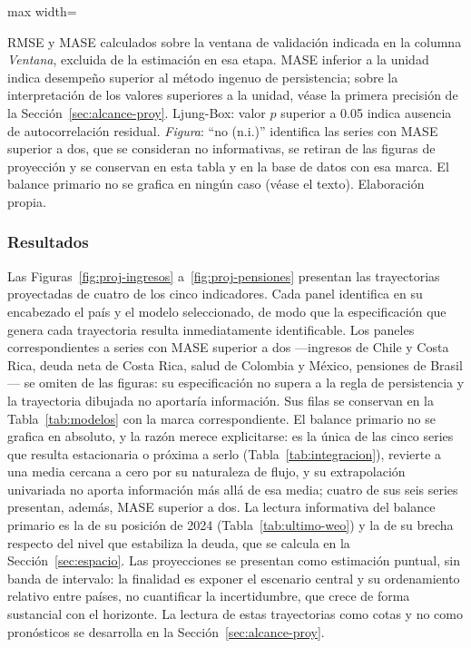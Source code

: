 \documentclass[12pt, letterpaper]{article}
\begin{document}
\begin{table}[htbp]
  \centering
  \caption{Modelo seleccionado por serie, desempeño fuera de muestra y diagnóstico
  de residuales.}
  \label{tab:modelos}
  \begin{adjustbox}{max width=\textwidth}
  
  \end{adjustbox}

  \vspace{2pt}
  \footnotesize
  RMSE y MASE calculados sobre la ventana de validación indicada en la columna
  \emph{Ventana}, excluida de la estimación en esa etapa. MASE inferior a la unidad
  indica desempeño superior al método ingenuo de persistencia; sobre la
  interpretación de los valores superiores a la unidad, véase la primera precisión
  de la Sección~\ref{sec:alcance-proy}. Ljung-Box: valor $p$ superior a 0.05 indica
  ausencia de autocorrelación residual. \emph{Figura}: ``no (n.i.)'' identifica las
  series con MASE superior a dos, que se consideran no informativas, se retiran de
  las figuras de proyección y se conservan en esta tabla y en la base de datos con
  esa marca. El balance primario no se grafica en ningún caso (véase el texto).
  Elaboración propia.
\end{table}

\subsubsection{Resultados}

Las Figuras~\ref{fig:proj-ingresos} a~\ref{fig:proj-pensiones} presentan las
trayectorias proyectadas de cuatro de los cinco indicadores. Cada panel identifica
en su encabezado el país y el modelo seleccionado, de modo que la especificación
que genera cada trayectoria resulta inmediatamente identificable. Los paneles
correspondientes a series con MASE superior a dos ---ingresos de Chile y Costa
Rica, deuda neta de Costa Rica, salud de Colombia y México, pensiones de Brasil---
se omiten de las figuras: su especificación no supera a la regla de persistencia y
la trayectoria dibujada no aportaría información. Sus filas se conservan en la
Tabla~\ref{tab:modelos} con la marca correspondiente. El balance primario no se
grafica en absoluto, y la razón merece explicitarse: es la única de las cinco
series que resulta estacionaria o próxima a serlo (Tabla~\ref{tab:integracion}),
revierte a una media cercana a cero por su naturaleza de flujo, y su extrapolación
univariada no aporta información más allá de esa media; cuatro de sus seis series
presentan, además, MASE superior a dos. La lectura informativa del balance primario
es la de su posición de 2024 (Tabla~\ref{tab:ultimo-weo}) y la de su brecha respecto
del nivel que estabiliza la deuda, que se calcula en la Sección~\ref{sec:espacio}.
Las proyecciones se presentan como estimación puntual,
sin banda de intervalo: la finalidad es exponer el escenario central y su ordenamiento
relativo entre países, no cuantificar la incertidumbre, que crece de forma sustancial
con el horizonte. La lectura de estas trayectorias como cotas y no como pronósticos
se desarrolla en la Sección~\ref{sec:alcance-proy}.
\end{document}
